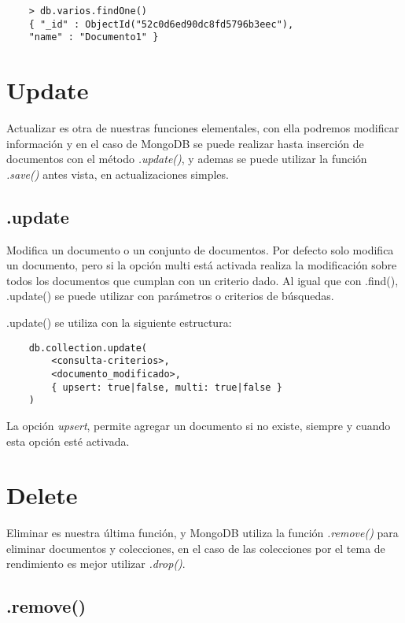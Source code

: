 \begin{lstlisting}
    > db.varios.findOne()
    { "_id" : ObjectId("52c0d6ed90dc8fd5796b3eec"),
    "name" : "Documento1" }
\end{lstlisting}

\section{Update}

Actualizar es otra de nuestras funciones elementales, con ella podremos modificar informaci\'on y en el caso de MongoDB se puede realizar hasta inserci\'on de documentos con el m\'etodo \textit{.update()}, y ademas se puede utilizar la funci\'on \textit{.save()} antes vista, en actualizaciones simples.

\subsection{.update}

Modifica un documento o un conjunto de documentos. Por defecto solo modifica un documento, pero si la opci\'on multi est\'a activada realiza la modificaci\'on sobre todos los documentos que cumplan con un criterio dado. Al igual que con .find(), .update() se puede utilizar con par\'ametros o criterios de b\'usquedas.

.update() se utiliza con la siguiente estructura:

\begin{lstlisting}
    db.collection.update(
        <consulta-criterios>,
        <documento_modificado>,
        { upsert: true|false, multi: true|false }
    )
\end{lstlisting}

La opci\'on \textit{upsert}, permite agregar un documento si no existe, siempre y cuando esta opci\'on est\'e activada.

\section{Delete}

Eliminar es nuestra \'ultima funci\'on, y MongoDB utiliza la funci\'on \textit{.remove()} para eliminar documentos y colecciones, en el caso de las colecciones por el tema de rendimiento es mejor utilizar \textit{.drop()}.

\subsection{.remove()}

